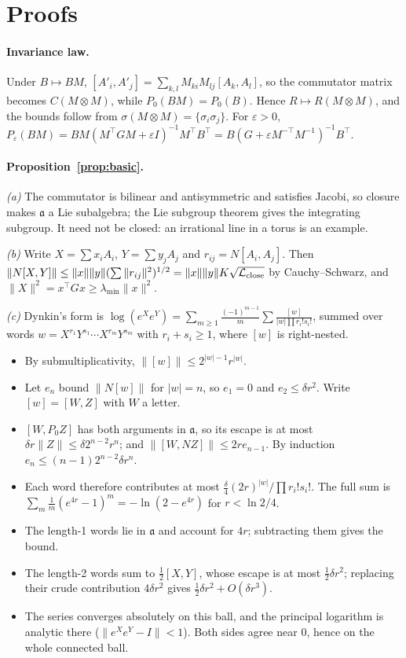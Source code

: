 \section{Proofs}\label{app:proofs}
\paragraph{Invariance law.}
Under $B\mapsto BM$, $[A'_i,A'_j]=\sum_{k,l}M_{ki}M_{lj}[A_k,A_l]$, so the commutator matrix becomes
$C(M\otimes M)$, while $P_0(BM)=P_0(B)$. Hence $R\mapsto R(M\otimes M)$, and the bounds follow from
$\sigma(M\otimes M)=\{\sigma_i\sigma_j\}$. For $\varepsilon>0$,
$P_\varepsilon(BM)=BM(M^\top GM+\varepsilon I)^{-1}M^\top B^\top=B(G+\varepsilon M^{-\top}M^{-1})^{-1}B^\top$.

\paragraph{Proposition~\ref{prop:basic}.}
\emph{(a)} The commutator is bilinear and antisymmetric and satisfies Jacobi, so closure makes $\mathfrak a$ a Lie
subalgebra; the Lie subgroup theorem \citep[Ch.~5]{hall2015lie} gives the integrating subgroup. It need not be
closed: an irrational line in a torus is an example.

\emph{(b)} Write $X=\sum x_iA_i$, $Y=\sum y_jA_j$ and $r_{ij}=N[A_i,A_j]$. Then
$\|N[X,Y]\|\le\|x\|\|y\|(\sum\|r_{ij}\|^2)^{1/2}=\|x\|\|y\|K\sqrt{\mathcal{L}_{\mathrm{close}}}$ by Cauchy--Schwarz, and
$\|X\|^2=x^\top Gx\ge\lambda_{\min}\|x\|^2$.

\emph{(c)} Dynkin's form \citep{bonfiglioli2012topics} is
$\log(e^Xe^Y)=\sum_{m\ge1}\frac{(-1)^{m-1}}{m}\sum\frac{[w]}{|w|\prod r_i!s_i!}$, summed over words
$w=X^{r_1}Y^{s_1}\cdots X^{r_m}Y^{s_m}$ with $r_i+s_i\ge1$, where $[w]$ is right-nested.
\begin{itemize}
\item By submultiplicativity, $\|[w]\|\le2^{|w|-1}r^{|w|}$.
\item Let $e_n$ bound $\|N[w]\|$ for $|w|=n$, so $e_1=0$ and $e_2\le\delta r^2$. Write $[w]=[W,Z]$ with $W$ a letter.
\item $[W,P_0Z]$ has both arguments in $\mathfrak a$, so its escape is at most $\delta r\|Z\|\le\delta2^{n-2}r^n$;
and $\|[W,NZ]\|\le2re_{n-1}$. By induction $e_n\le(n-1)2^{n-2}\delta r^n$.
\item Each word therefore contributes at most $\frac{\delta}{4}(2r)^{|w|}/\prod r_i!s_i!$. The full sum is
$\sum_m\frac1m(e^{4r}-1)^m=-\ln(2-e^{4r})$ for $r<\ln2/4$.
\item The length-1 words lie in $\mathfrak a$ and account for $4r$; subtracting them gives the bound.
\item The length-2 words sum to $\frac12[X,Y]$, whose escape is at most $\frac12\delta r^2$; replacing their crude
contribution $4\delta r^2$ gives $\frac12\delta r^2+O(\delta r^3)$.
\item The series converges absolutely on this ball, and the principal logarithm is analytic there
($\|e^Xe^Y-I\|<1$). Both sides agree near $0$, hence on the whole connected ball.
\end{itemize}

